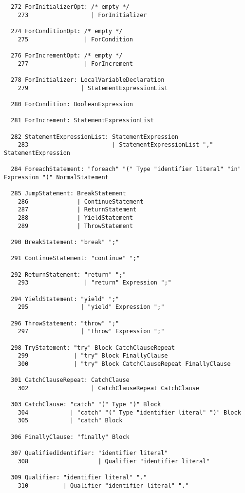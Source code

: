 \begin{espacosimples}
\begin{scriptsize}
\begin{lstlisting}
  272 ForInitializerOpt: /* empty */
    273                  | ForInitializer
  
  274 ForConditionOpt: /* empty */
    275                | ForCondition
  
  276 ForIncrementOpt: /* empty */
    277                | ForIncrement
  
  278 ForInitializer: LocalVariableDeclaration
    279               | StatementExpressionList
  
  280 ForCondition: BooleanExpression
  
  281 ForIncrement: StatementExpressionList
  
  282 StatementExpressionList: StatementExpression
    283                        | StatementExpressionList "," StatementExpression
  
  284 ForeachStatement: "foreach" "(" Type "identifier literal" "in" Expression ")" NormalStatement
  
  285 JumpStatement: BreakStatement
    286              | ContinueStatement
    287              | ReturnStatement
    288              | YieldStatement
    289              | ThrowStatement
  
  290 BreakStatement: "break" ";"
  
  291 ContinueStatement: "continue" ";"
  
  292 ReturnStatement: "return" ";"
    293                | "return" Expression ";"
  
  294 YieldStatement: "yield" ";"
    295               | "yield" Expression ";"
  
  296 ThrowStatement: "throw" ";"
    297               | "throw" Expression ";"
  
  298 TryStatement: "try" Block CatchClauseRepeat
    299             | "try" Block FinallyClause
    300             | "try" Block CatchClauseRepeat FinallyClause
  
  301 CatchClauseRepeat: CatchClause
    302                  | CatchClauseRepeat CatchClause
  
  303 CatchClause: "catch" "(" Type ")" Block
    304            | "catch" "(" Type "identifier literal" ")" Block
    305            | "catch" Block
  
  306 FinallyClause: "finally" Block
  
  307 QualifiedIdentifier: "identifier literal"
    308                    | Qualifier "identifier literal"
  
  309 Qualifier: "identifier literal" "."
    310          | Qualifier "identifier literal" "."
  

\end{lstlisting}
\end{scriptsize}
\end{espacosimples}
